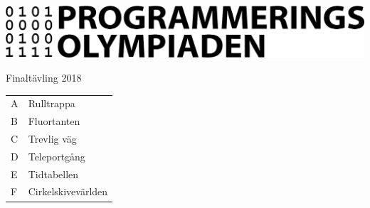 \documentclass{article}
\begin{document}
\pagestyle{empty}
  \includegraphics[width=\textwidth]{logo.png}
  \\[4em]
\begin{center}
  \Huge{Finaltävling 2018}
  \\[6em]
  \LARGE{
  \begin{tabular}{ll}
    A & Rulltrappa \\
    B & Fluortanten \\
    C & Trevlig väg \\
    D & Teleportgång\\
    E & Tidtabellen \\
    F & Cirkelskivevärlden \\
  \end{tabular}
}
\end{center}
\end{document}

